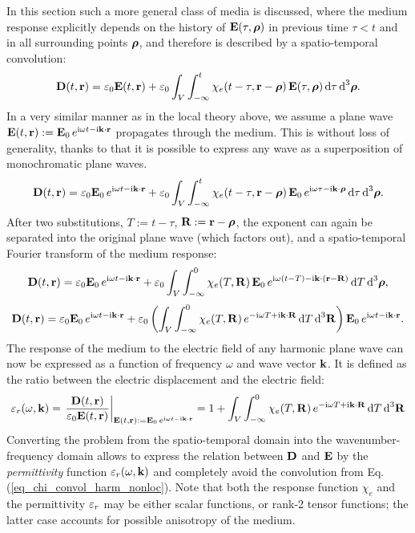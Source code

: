 In this section such a more general class of media is discussed, where the medium response explicitly depends on the history of $\mathbf{E}(\tau, \boldsymbol{\rho})$ in previous time $\tau < t$ and in all surrounding points $\boldsymbol{\rho}$, and therefore is described by a spatio-temporal convolution:
\begin{equation} \mathbf{D}(t,{\mathbf{r}}) = \varepsilon_0 \mathbf{E}(t,{\mathbf{r}}) + \varepsilon_0\int_{V} \int_{-\infty}^{t} \chi_e(t-\tau, {\mathbf{r}}-\boldsymbol{\rho}) \, \mathbf{E}(\tau,\boldsymbol{\rho}) \,\mbox{d}\tau \,\mbox{d}^3\boldsymbol{\rho}. \label{eq_chi_convol_nonloc}\end{equation}
In a very similar manner as in the local theory above, we assume a plane wave $\mathbf{E}(t, {\mathbf{r}}) := \mathbf{E}_0 \, e^{{\mathrm i}\omega t - {\mathrm i}{\mathbf{k}}\cdot{\mathbf{r}}}$ propagates through the medium. This is without loss of generality, thanks to that it is possible to express any wave as a superposition of monochromatic plane waves.
\begin{equation} \mathbf{D}(t,{\mathbf{r}}) = \varepsilon_0 \mathbf{E}_0 \, e^{{\mathrm i}\omega t - {\mathrm i}{\mathbf{k}}\cdot{\mathbf{r}}} + \varepsilon_0\int_{V} \int_{-\infty}^{t} \chi_e(t-\tau, {\mathbf{r}}-\boldsymbol{\rho}) \, \mathbf{E}_0 \, e^{{\mathrm i}\omega \tau - {\mathrm i}{\mathbf{k}}\cdot\boldsymbol{\rho}} \,\mbox{d}\tau \,\mbox{d}^3\boldsymbol{\rho}. \label{eq_chi_convol_harm_nonloc}\end{equation}
After two  substitutions, $T:=t-\tau$, $\mathbf{R}:={\mathbf{r}}-\boldsymbol{\rho}$, the exponent can again be separated into the original plane wave (which factors out), and a spatio-temporal Fourier transform of the medium response:
$$				 \mathbf{D}(t,{\mathbf{r}}) = \varepsilon_0 \mathbf{E}_0 \, e^{{\mathrm i}\omega t - {\mathrm i}{\mathbf{k}}\cdot{\mathbf{r}}} + \varepsilon_0\int_{V} \int_{-\infty}^{0} \chi_e(T, \mathbf{R}) \, \mathbf{E}_0 \, e^{{\mathrm i}\omega (t - T) - {\mathrm i}{\mathbf{k}}\cdot({\mathbf{r}} - \mathbf{R})} \,\mbox{d}T \,\mbox{d}^3\boldsymbol{\rho},$$
$$				 \mathbf{D}(t,{\mathbf{r}}) = \varepsilon_0 \mathbf{E}_0 \, e^{{\mathrm i}\omega t - {\mathrm i}{\mathbf{k}}\cdot{\mathbf{r}}} + \varepsilon_0\left( \int_{V} \int_{-\infty}^{0} \chi_e(T, \mathbf{R})  \, e^{-{\mathrm i}\omega T + {\mathrm i}{\mathbf{k}}\cdot \mathbf{R}}\,\mbox{d}T \,\mbox{d}^3 \mathbf{R} \right) \mathbf{E}_0 \, e^{{\mathrm i}\omega t - {\mathrm i}{\mathbf{k}}\cdot{\mathbf{r}}}.$$
The response of the medium to the electric field of any harmonic plane wave can now be expressed as a function of frequency $\omega$ and wave vector ${\mathbf{k}}$. It is defined as the ratio between the electric displacement and the electric field:
\begin{equation} \varepsilon_r(\omega, {\mathbf{k}}) = \left.\frac{\mathbf{D}(t,{\mathbf{r}})}{\varepsilon_0 \mathbf{E}(t,{\mathbf{r}})} \right|_{\mathbf{E}(t, {\mathbf{r}}) := \mathbf{E}_0 \, e^{{\mathrm i}\omega t - {\mathrm i}{\mathbf{k}}\cdot{\mathbf{r}}}}  = 1 + \int_{V} \int_{-\infty}^{0} \chi_e(T, \mathbf{R}) \,e^{-{\mathrm i}\omega T + {\mathrm i}{\mathbf{k}}\cdot \mathbf{R}} \,\mbox{d}T \,\mbox{d}^3\mathbf{R} \label{eq_eps_nonloc}\end{equation}
Converting the problem from the spatio-temporal domain into the wavenumber-frequency domain allows to express the relation between $\mathbf{D}$ and $\mathbf{E}$ by the \textit{permittivity} function $\varepsilon_r(\omega, {\mathbf{k}})$ and completely avoid the convolution from Eq. (\ref{eq_chi_convol_harm_nonloc}). Note that both the response function $\chi_e$ and the permittivity $\varepsilon_r$ %
may be either scalar functions, or rank-2 tensor functions; the latter case accounts for possible anisotropy of the medium.

